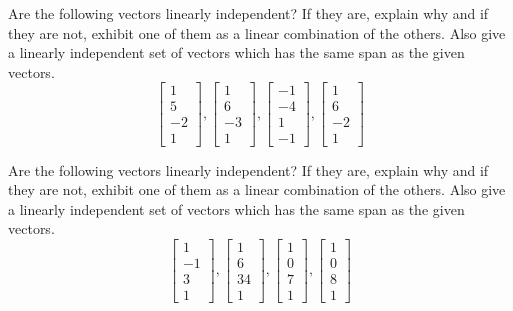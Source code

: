\documentclass{ximera}
\begin{document}
\begin{problem}\label{prb:3.17} Are the following vectors linearly independent? If they are, explain
why and if they are not, exhibit one of them as a linear combination of the
others. Also give a linearly independent set of vectors which has the same
span as the given vectors.
\begin{equation*}
\left[
\begin{array}{r}
1 \\
5 \\
-2 \\
1
\end{array}
\right] ,\left[
\begin{array}{r}
1 \\
6 \\
-3 \\
1
\end{array}
\right] ,\left[
\begin{array}{r}
-1 \\
-4 \\
1 \\
-1
\end{array}
\right] ,\left[
\begin{array}{r}
1 \\
6 \\
-2 \\
1
\end{array}
\right]
\end{equation*}
\end{problem}

\begin{problem}\label{prb:3.18} Are the following vectors linearly independent? If they are, explain
why and if they are not, exhibit one of them as a linear combination of the
others. Also give a linearly independent set of vectors which has the same
span as the given vectors.
\begin{equation*}
\left[
\begin{array}{r}
1 \\
-1 \\
3 \\
1
\end{array}
\right] ,\left[
\begin{array}{r}
1 \\
6 \\
34 \\
1
\end{array}
\right] ,\left[
\begin{array}{r}
1 \\
0 \\
7 \\
1
\end{array}
\right] ,\left[
\begin{array}{r}
1 \\
0 \\
8 \\
1
\end{array}
\right]
\end{equation*}
\end{problem}
\end{document}
